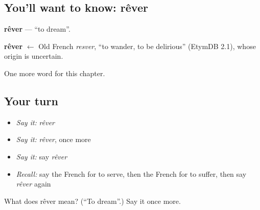 \subsection*{You'll want to know: rêver}
\textbf{rêver} — \textquotedblleft{}to dream\textquotedblright{}.

\begin{cousinweb}
\textbf{rêver} $\leftarrow$ Old French \emph{resver}, \textquotedblleft{}to wander, to be delirious\textquotedblright{} (EtymDB 2.1), whose origin is uncertain.
\end{cousinweb}

\begin{grammarlens}[title={What you've built}]
One more word for this chapter.
\end{grammarlens}

\subsection*{Your turn}
\begin{itemize}
\raggedright
  \item \emph{Say it:} \emph{rêver}
  \item \emph{Say it:} \emph{rêver}, once more
  \item \emph{Say it:} say \emph{rêver}
  \item \emph{Recall:} say the French for to serve, then the French for to suffer, then say \emph{rêver} again
\end{itemize}

\begin{tcolorbox}[breakable,colback=teal!4,colframe=teal!35!black,title={Before you move on}]
What does rêver mean? (\textquotedblleft{}To dream\textquotedblright{}.) Say it once more.
\end{tcolorbox}
